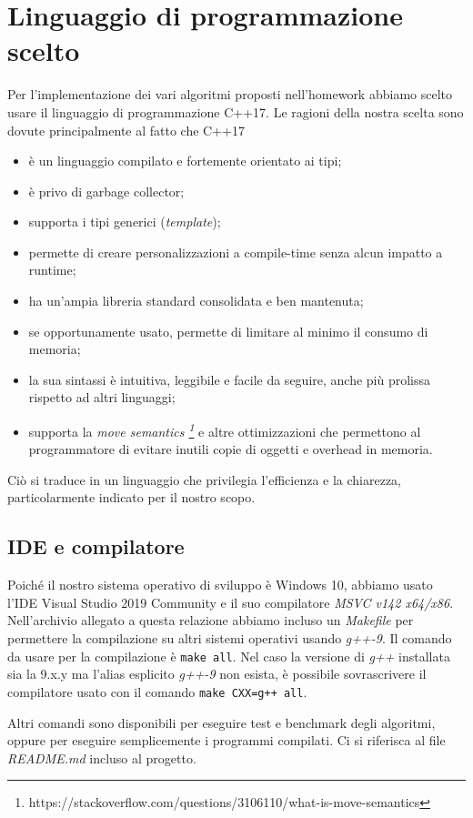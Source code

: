\section{Linguaggio di programmazione scelto}
\label{cap:language-choice}

Per l'implementazione dei vari algoritmi proposti nell'homework abbiamo scelto usare il linguaggio di programmazione
C++17. Le ragioni della nostra scelta sono dovute principalmente al fatto che C++17

\begin{itemize}
    \item è un linguaggio compilato e fortemente orientato ai tipi;
    \item è privo di garbage collector;
    \item supporta i tipi generici (\textit{template});
    \item permette di creare personalizzazioni a compile-time senza alcun impatto a runtime;
    \item ha un'ampia libreria standard consolidata e ben mantenuta;
    \item se opportunamente usato, permette di limitare al minimo il consumo di memoria;
    \item la sua sintassi è intuitiva, leggibile e facile da seguire, anche più prolissa rispetto ad altri linguaggi;
    \item supporta la \textit{move semantics \footnote{https://stackoverflow.com/questions/3106110/what-is-move-semantics} } e altre ottimizzazioni che permettono al programmatore di evitare inutili copie di oggetti e overhead in memoria.
\end{itemize}
Ciò si traduce in un linguaggio che privilegia l'efficienza e la chiarezza, particolarmente indicato per il nostro scopo.

\subsection{IDE e compilatore}

Poiché il nostro sistema operativo di sviluppo è Windows 10, abbiamo usato l'IDE Visual Studio 2019 Community e il suo compilatore \textit{MSVC v142 x64/x86}. \\

\noindent Nell'archivio allegato a questa relazione abbiamo incluso un \textit{Makefile} per permettere la compilazione su altri sistemi operativi usando \textit{g++-9}. Il comando da usare per la compilazione è \texttt{make all}. Nel caso la versione di \textit{g++} installata sia la 9.x.y ma l'alias esplicito \textit{g++-9} non esista, è possibile sovrascrivere il compilatore usato con il comando \texttt{make CXX=g++ all}.

Altri comandi sono disponibili per eseguire test e benchmark degli algoritmi, oppure per eseguire semplicemente i programmi compilati. Ci si riferisca al file \textit{README.md} incluso al progetto.
